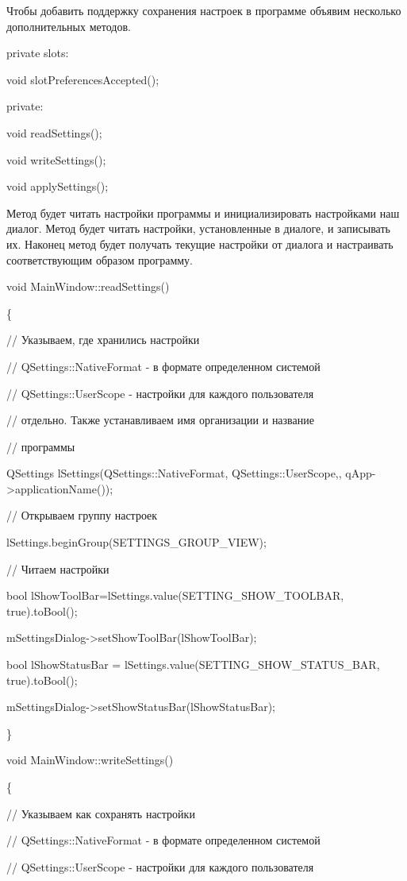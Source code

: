 Чтобы добавить поддержку сохранения настроек в программе объявим несколько дополнительных методов. 

private slots:

 void slotPreferencesAccepted();

private:

 void readSettings();

 void writeSettings();

 void applySettings();

Метод  будет читать настройки программы и инициализировать настройками наш диалог. Метод
 будет читать настройки, установленные в диалоге, и записывать их. Наконец метод
 будет получать текущие настройки от диалога и настраивать соответствующим образом
программу. 

void MainWindow::readSettings()

\{

// Указываем, где хранились настройки 

// QSettings::NativeFormat - в формате определенном системой 

// QSettings::UserScope - настройки для каждого пользователя

// отдельно. Также устанавливаем имя организации и название

// программы 

QSettings lSettings(QSettings::NativeFormat, QSettings::UserScope,,
qApp-{>}applicationName());

// Открываем группу настроек 

lSettings.beginGroup(SETTINGS\_GROUP\_VIEW);

// Читаем настройки 

bool lShowToolBar=lSettings.value(SETTING\_SHOW\_TOOLBAR, true).toBool();

mSettingsDialog-{>}setShowToolBar(lShowToolBar);

bool lShowStatusBar = lSettings.value(SETTING\_SHOW\_STATUS\_BAR, true).toBool();

mSettingsDialog-{>}setShowStatusBar(lShowStatusBar);

\}

void MainWindow::writeSettings()

\{

// Указываем как сохранять настройки 

// QSettings::NativeFormat - в формате определенном системой 

// QSettings::UserScope - настройки для каждого пользователя

